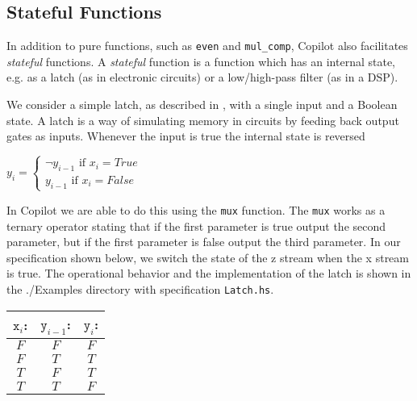 \subsection{Stateful Functions} \label{sec:stateful}

In addition to pure functions, such as {\tt even} and {\tt mul\_comp}, Copilot
also facilitates \emph{stateful} functions.
%
A \emph{stateful} function is a function which has an internal state, e.g. as a
latch (as in electronic circuits) or a low/high-pass filter (as in a DSP).

\begin{example} We consider a simple latch, as described in \cite{Farhat2004},
with a single input and a Boolean state.
%
A latch is a way of simulating memory in circuits by feeding back output gates
as inputs.
%
Whenever the input is true the internal state is reversed 
%
\begin{center}
${y}_{i}=\begin{cases}
\neg{y}_{i-1} \text{ if } {x}_{i} = True\\
{y}_{i-1} \text{ if } {x}_{i} = False
\end{cases}$
\end{center} 
%
In Copilot we are able to do this using the {\tt mux} function.
%
The {\tt mux} works as a ternary operator stating that if the first parameter is true output the second parameter, but if the first parameter is false output the third parameter.
%
In our specification shown below, we switch the state of the z stream when the x stream is true. 
%
The operational behavior and the implementation of the latch is shown in the
./Examples directory with specification {\tt Latch.hs}.

\begin{center}
\begin{minipage}{0.25\linewidth}
\begin{tabular}{c|c||c}
$\mathtt{x}_i$: & $\mathtt{y}_{i-1}$: & $\mathtt{y}_i$:\\
\hline
$F$ & $F$ & $F$ \\
\hline
$F$ & $T$ & $T$ \\
\hline
$T$ & $F$ & $T$ \\
\hline
$T$ & $T$ & $F$
\end{tabular}
\end{minipage}
\end{center}
\end{example}



